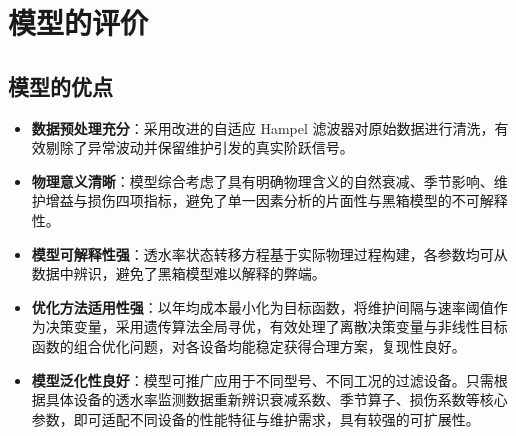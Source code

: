 \documentclass[withoutpreface,bwprint]{cumcmthesis}
\begin{document}





\section{模型的评价}

\subsection{模型的优点}

\begin{itemize}
	\item \textbf{数据预处理充分}：采用改进的自适应 Hampel 滤波器对原始数据进行清洗，有效剔除了异常波动并保留维护引发的真实阶跃信号。
	
	\item \textbf{物理意义清晰}：模型综合考虑了具有明确物理含义的自然衰减、季节影响、维护增益与损伤四项指标，避免了单一因素分析的片面性与黑箱模型的不可解释性。
	
	\item \textbf{模型可解释性强}：透水率状态转移方程基于实际物理过程构建，各参数均可从数据中辨识，避免了黑箱模型难以解释的弊端。
	
	\item \textbf{优化方法适用性强}：以年均成本最小化为目标函数，将维护间隔与速率阈值作为决策变量，采用遗传算法全局寻优，有效处理了离散决策变量与非线性目标函数的组合优化问题，对各设备均能稳定获得合理方案，复现性良好。
	
	\item \textbf{模型泛化性良好}：模型可推广应用于不同型号、不同工况的过滤设备。只需根据具体设备的透水率监测数据重新辨识衰减系数、季节算子、损伤系数等核心参数，即可适配不同设备的性能特征与维护需求，具有较强的可扩展性。
\end{itemize}
\end{document}
